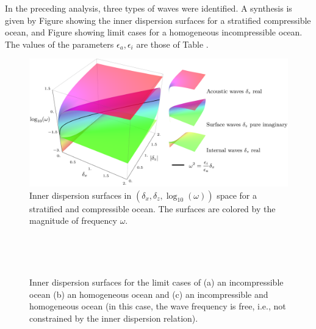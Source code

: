 \documentclass[a4paper,11pt]{article}
\begin{document}
In the preceding analysis, three types of waves were identified. A synthesis is given by Figure  showing the inner dispersion surfaces for a stratified compressible ocean, and Figure  showing limit cases for a homogeneous incompressible ocean. The values of the parameters $\epsilon_a, \epsilon_i$ are those of Table .
%
\begin{figure}[h]
	\centerline{
		\includegraphics[width=1\linewidth]{FIGURES/unboundedwaves.png}
	}
	\caption{Inner dispersion surfaces in $(\delta_x, \delta_z, \log_{10}(\omega))$ space for a stratified and compressible ocean. The surfaces are colored by the magnitude of frequency $\omega$.}
	\label{FigFullstratifiedcompressible}
\end{figure}
\\
\begin{figure}[h]
	\centering		
	\\
	\centering		
	\caption{Inner dispersion surfaces for the limit cases of (a) an incompressible ocean (b) an homogeneous ocean and (c) an incompressible and homogeneous ocean (in this case, the wave frequency is free, i.e., not constrained by the inner dispersion relation).}
	\label{FigFullsimplifiedcases}
\end{figure}
\end{document}
